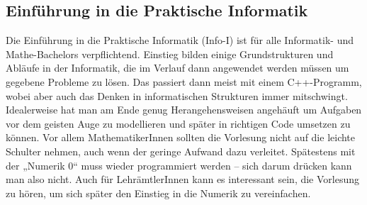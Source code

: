 \subsection{Einführung in die Praktische Informatik}
\label{info1}
Die Einführung in die Praktische Informatik (Info-I) ist für alle Informatik- und Mathe-Bachelors verpflichtend. Einstieg bilden einige Grundstrukturen und Abläufe in der Informatik, die im Verlauf dann angewendet werden müssen um gegebene Probleme zu lösen. Das passiert dann meist mit einem C++-Programm, wobei aber auch das Denken in informatischen Strukturen immer mitschwingt. Idealerweise hat man am Ende genug Herangehensweisen angehäuft um Aufgaben vor dem geisten Auge zu modellieren und später in richtigen Code umsetzen zu können. Vor allem MathematikerInnen sollten die Vorlesung nicht auf die leichte Schulter nehmen, auch wenn der geringe Aufwand dazu verleitet. Spätestens mit der „Numerik 0“ muss wieder programmiert werden -- sich darum drücken kann man also nicht. Auch für LehrämtlerInnen kann es interessant sein, die Vorlesung zu hören, um sich später den Einstieg in die Numerik zu vereinfachen.
